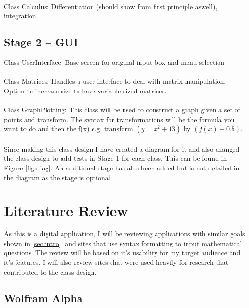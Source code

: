 \documentclass[final]{cmpreport}
\begin{document}
	\\Class Calculus: Differentiation (should show from first principle aswell), integration
	\\\subsection*{Stage 2 – GUI}
	Class UserInterface: Base screen for original input box and menu selection\\
	\\Class Matrices: Handles a user interface to deal with matrix manipulation. Option to increase size to have variable sized matrices.\\
	\\Class GraphPlotting: This class will be used to construct a graph given a set of points and transform. The syntax for transformations will be the formula you want to do and then the f(x) e.g. transform $(y=x^2+13)$ by $(f(x)+0.5)$.\\
	\\Since making this class design I have created a diagram for it and also changed the class design to add tests in Stage 1 for each class. This can be found in Figure \ref{fig:diag}. An additional stage has also been added but is not detailed in the diagram as the stage is optional.

	\section{Literature Review} \label{sec:lit}
	
	As this is a digital application, I will be reviewing applications with similar goals shown in \ref{sec:intro}, and sites that use syntax formatting to input mathematical questions. The review will be based on it's usability for my target audience and it's features. I will also review sites that were used heavily for research that contributed to the class design.
	
	\subsection{Wolfram Alpha}
	
\end{document}
